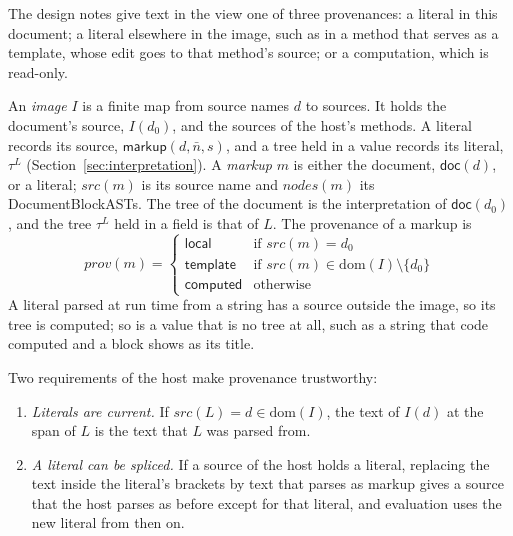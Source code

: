 \documentclass[11pt]{article}
\numberwithin{equation}{section}
\newcommand{\kw}[1]{\ensuremath{\mathsf{#1}}}
\begin{document}
The design notes give text in the view one of three provenances: a literal
in this document; a literal elsewhere in the image, such as in a method
that serves as a template, whose edit goes to that method's source; or a
computation, which is read-only.

An \emph{image} $I$ is a finite map from source names $d$ to sources.  It
holds the document's source, $I(d_0)$, and the sources of the host's
methods.  A literal records its source, $\kw{markup}(d, \bar n, s)$, and a
tree held in a value records its literal, $\tau^{L}$
(Section~\ref{sec:interpretation}).  A \emph{markup} $m$ is either the
document, $\kw{doc}(d)$, or a literal; $\mathit{src}(m)$ is its source name
and $\mathit{nodes}(m)$ its DocumentBlockASTs.  The tree of the document is
the interpretation of $\kw{doc}(d_0)$, and the tree $\tau^L$ held in a
field is that of $L$.  The provenance of a markup is
\begin{equation}\label{eq:provenance}
\mathit{prov}(m) =
\begin{cases}
\kw{local} & \text{if } \mathit{src}(m) = d_0 \\
\kw{template} & \text{if } \mathit{src}(m) \in \mathrm{dom}(I)
  \setminus \{d_0\} \\
\kw{computed} & \text{otherwise}
\end{cases}
\end{equation}
A literal parsed at run time from a string has a source outside the image,
so its tree is computed; so is a value that is no tree at all, such as a
string that code computed and a block shows as its title.

Two requirements of the host make provenance trustworthy:
\begin{enumerate}
\item[(H9)] \emph{Literals are current.}  If $\mathit{src}(L) = d \in
      \mathrm{dom}(I)$, the text of $I(d)$ at the span of $L$ is the text
      that $L$ was parsed from.
\item[(H10)] \emph{A literal can be spliced.}  If a source of the host
      holds a literal, replacing the text inside the literal's brackets by
      text that parses as markup gives a source that the host parses as
      before except for that literal, and evaluation uses the new literal
      from then on.
\end{enumerate}
\end{document}
